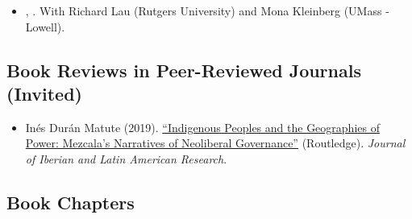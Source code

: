 \begin{itemize}



  	\item[\textcolor{gray}{\textbullet}] \href{https://raw.githubusercontent.com/hbahamonde/Running_Tally/master/abstract.txt}{\unskip}, {\bf \emph{\unskip}}. With Richard Lau (Rutgers University) and Mona Kleinberg (UMass - Lowell). 

\end{itemize}




\subsection*{Book Reviews in Peer-Reviewed Journals (Invited)}

\begin{itemize}
	\item[\textcolor{gray}{\textbullet}] In\'es Dur\'an Matute (2019). \href{https://doi.org/10.1080/13260219.2019.1671679}{``Indigenous Peoples and the Geographies of Power: Mezcala's Narratives of Neoliberal Governance''} (Routledge). \emph{Journal of Iberian and Latin American Research}. %
\end{itemize}

\subsection*{Book Chapters}

